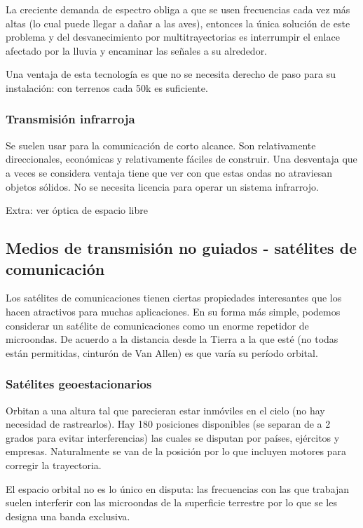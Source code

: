 \documentclass{book}
\begin{document}
	\vspace{3mm}
	La creciente demanda de espectro obliga a que se usen frecuencias cada vez más altas (lo cual puede llegar a dañar a las aves), entonces la única solución de este problema y del desvanecimiento por multitrayectorias es interrumpir el enlace afectado por la lluvia y encaminar las señales a su alrededor.
	
	\vspace{3mm}
	Una ventaja de esta tecnología es que no se necesita derecho de paso para su instalación: con terrenos cada 50k es suficiente.
	
	\subsubsection{Transmisión infrarroja}
	Se suelen usar para la comunicación de corto alcance. Son relativamente direccionales, económicas y relativamente fáciles de construir. Una desventaja que a veces se considera ventaja tiene que ver con que estas ondas no atraviesan objetos sólidos. No se necesita licencia para operar un sistema infrarrojo.
	
	\vspace{3mm}
	Extra: ver óptica de espacio libre
	
	\pagebreak
	\subsection{Medios de transmisión no guiados - satélites de comunicación}
	Los satélites de comunicaciones tienen ciertas propiedades interesantes que los hacen atractivos para muchas aplicaciones. En su forma más simple, podemos considerar un satélite de comunicaciones como un enorme repetidor de microondas. De acuerdo a la distancia desde la Tierra a la que esté (no todas están permitidas, cinturón de Van Allen) es que varía su período orbital.
	
	\subsubsection{Satélites geoestacionarios}
	Orbitan a una altura tal que parecieran estar inmóviles en el cielo (no hay necesidad de rastrearlos). Hay 180 posiciones disponibles (se separan de a 2 grados para evitar interferencias) las cuales se disputan por países, ejércitos y empresas. Naturalmente se van de la posición por lo que incluyen motores para corregir la trayectoria.
	
	\vspace{3mm}
	El espacio orbital no es lo único en disputa: las frecuencias con las que trabajan suelen interferir con las microondas de la superficie terrestre por lo que se les designa una banda exclusiva.
	
\end{document}
